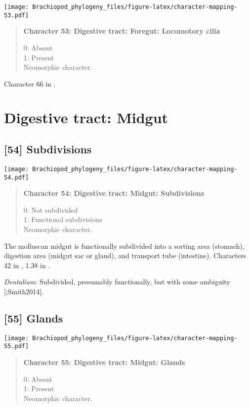 \documentclass[openany]{book}
\theoremstyle{definition}
\theoremstyle{definition}
\theoremstyle{definition}
\theoremstyle{remark}
\begin{document}
\texttt{[image: Brachiopod\_phylogeny\_files/figure-latex/character-mapping-53.pdf]}

\begin{quote}
\textbf{Character 53: Digestive tract: Foregut: Locomotory cilia}

0: Absent\\
1: Present\\
Neomorphic character.
\end{quote}

Character 66 in \citet{Haszprunar2000}.

\section{Digestive tract: Midgut}\label{digestive-tract-midgut}

\subsection*{{[}54{]} Subdivisions}\label{subdivisions}

\texttt{[image: Brachiopod\_phylogeny\_files/figure-latex/character-mapping-54.pdf]}

\begin{quote}
\textbf{Character 54: Digestive tract: Midgut: Subdivisions}

0: Not subdivided\\
1: Functional subdivisions\\
Neomorphic character.
\end{quote}

The molluscan midgut is functionally subdivided into a sorting area
(stomach), digestion area (midgut sac or gland), and transport tube
(intestine). Characters 42 in \citet{Haszprunar2000}, 1.38 in
\citet{SPS1996}.

\hypertarget{Dentalium-coding-54}{}
\emph{Dentalium}: Subdivided, presumably functionally, but with some
ambiguity {[}\citet{Smith2012M};Smith2014{]}.

\subsection*{{[}55{]} Glands}\label{glands}

\texttt{[image: Brachiopod\_phylogeny\_files/figure-latex/character-mapping-55.pdf]}

\begin{quote}
\textbf{Character 55: Digestive tract: Midgut: Glands}

0: Absent\\
1: Present\\
Neomorphic character.
\end{quote}
\end{document}
